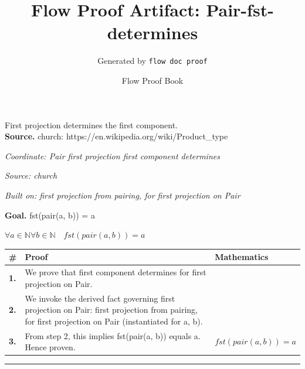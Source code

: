 \documentclass[11pt]{article}
\title{Flow Proof Artifact: Pair-fst-determines}
\author{Generated by \texttt{flow doc proof}}
\date{Flow Proof Book}
\theoremstyle{definition}
\begin{document}
\maketitle
First projection determines the first component.\\[0.5em]
\textbf{Source.} church: https://en.wikipedia.org/wiki/Product\_type\\[0.5em]
\bigskip
{}\par
\smallskip\noindent\textit{Coordinate: Pair \cdot first projection \cdot first component determines}\par
\smallskip\noindent\textit{Source: church}\par
\smallskip\noindent\textit{Built on: first projection from pairing, for first projection on Pair}\par
\medskip
\noindent\textbf{Goal.} fst(pair(a, b)) = a\par
\noindent$\displaystyle \forall a \in \mathbb{N} \forall b \in \mathbb{N}\quad fst(pair(a, b)) = a$\par
\medskip
\noindent
\begin{tabular}{@{} >{\raggedright\arraybackslash}p{} >{\raggedright\arraybackslash}p{} >{\raggedleft\arraybackslash}p{} @{}}
\textbf{\#} & \textbf{Proof} & \textbf{Mathematics} \\
\midrule
\textbf{1.} & We prove that first component determines for first projection on Pair. & \\[0.45em]
\textbf{2.} & We invoke the derived fact governing first projection on Pair: first projection from pairing, for first projection on Pair (instantiated for a, b). & \\[0.45em]
\textbf{3.} & From step 2, this implies fst(pair(a, b)) equals a. Hence proven. & $\displaystyle fst(pair(a, b)) = a$ \\[0.45em]
\bottomrule
\end{tabular}
\label{thm:Pair-first projection-first_component_determines}
\par\medskip\hrule
\end{document}
